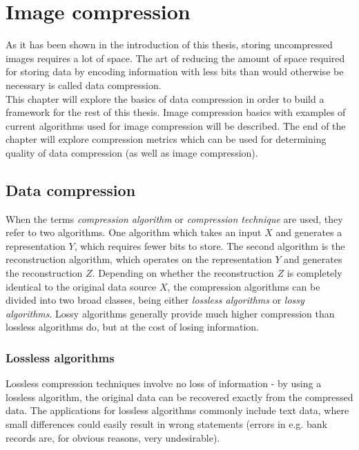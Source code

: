\documentclass[thesis=M,english]{FITthesis}[2012/10/20]
\begin{document}
\chapter{Image compression}
\label{ch:image-compression}
As it has been shown in the introduction of this thesis, storing uncompressed
images requires a lot of space. The art of reducing the amount of space required
for storing data by encoding information with less bits than would otherwise
be necessary is called data compression.
\\

This chapter will explore the basics of data compression in order to build
a framework for the rest of this thesis. Image compression basics with examples
of current algorithms used for image compression will be described. The end of
the chapter will explore compression metrics which can be used for determining
quality of data compression (as well as image compression).


\section{Data compression}
When the terms \emph{compression algorithm} or \emph{compression technique} are
used, they refer to two algorithms. One algorithm which takes an input $X$ and
generates a representation $Y$, which requires fewer bits to store. The second
algorithm is the reconstruction algorithm, which operates on the representation
$Y$ and generates the reconstruction $Z$. Depending on whether the reconstruction
$Z$ is completely identical to the original data source $X$, the compression
algorithms can be divided into two broad classes, being either \emph{lossless
algorithms} or \emph{lossy algorithms}. Lossy algorithms generally provide
much higher compression than lossless algorithms do, but at the cost of
losing information.\cite{datacompression}


\subsection{Lossless algorithms}
Lossless compression techniques involve no loss of information - by using
a lossless algorithm, the original data can be recovered exactly from the
compressed data. The applications for lossless algorithms commonly include
text data, where small differences could easily result in wrong statements
(errors in e.g. bank records are, for obvious reasons, very undesirable).
\end{document}

